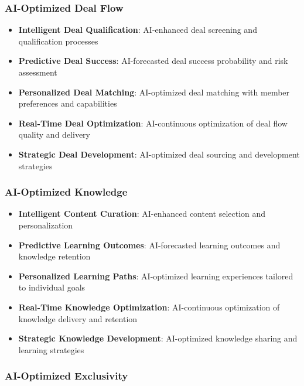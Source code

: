 \subsubsection{AI-Optimized Deal Flow}

\begin{itemize}
    \item \textbf{Intelligent Deal Qualification}: AI-enhanced deal screening and qualification processes
    \item \textbf{Predictive Deal Success}: AI-forecasted deal success probability and risk assessment
    \item \textbf{Personalized Deal Matching}: AI-optimized deal matching with member preferences and capabilities
    \item \textbf{Real-Time Deal Optimization}: AI-continuous optimization of deal flow quality and delivery
    \item \textbf{Strategic Deal Development}: AI-optimized deal sourcing and development strategies
\end{itemize}

\subsubsection{AI-Optimized Knowledge}

\begin{itemize}
    \item \textbf{Intelligent Content Curation}: AI-enhanced content selection and personalization
    \item \textbf{Predictive Learning Outcomes}: AI-forecasted learning outcomes and knowledge retention
    \item \textbf{Personalized Learning Paths}: AI-optimized learning experiences tailored to individual goals
    \item \textbf{Real-Time Knowledge Optimization}: AI-continuous optimization of knowledge delivery and retention
    \item \textbf{Strategic Knowledge Development}: AI-optimized knowledge sharing and learning strategies
\end{itemize}

\subsubsection{AI-Optimized Exclusivity}


